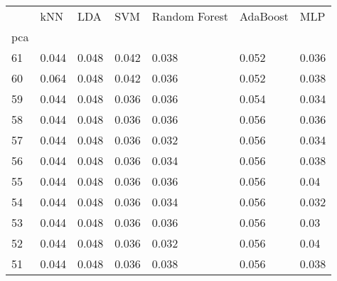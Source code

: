 \begin{tabular}{lllllll}
\toprule
{} &    kNN &    LDA &    SVM & Random Forest & AdaBoost &    MLP \\
pca &        &        &        &               &          &        \\
\midrule
61  &  0.044 &  0.048 &  0.042 &         0.038 &    0.052 &  0.036 \\
60  &  0.064 &  0.048 &  0.042 &         0.036 &    0.052 &  0.038 \\
59  &  0.044 &  0.048 &  0.036 &         0.036 &    0.054 &  0.034 \\
58  &  0.044 &  0.048 &  0.036 &         0.036 &    0.056 &  0.036 \\
57  &  0.044 &  0.048 &  0.036 &         0.032 &    0.056 &  0.034 \\
56  &  0.044 &  0.048 &  0.036 &         0.034 &    0.056 &  0.038 \\
55  &  0.044 &  0.048 &  0.036 &         0.036 &    0.056 &   0.04 \\
54  &  0.044 &  0.048 &  0.036 &         0.034 &    0.056 &  0.032 \\
53  &  0.044 &  0.048 &  0.036 &         0.036 &    0.056 &   0.03 \\
52  &  0.044 &  0.048 &  0.036 &         0.032 &    0.056 &   0.04 \\
51  &  0.044 &  0.048 &  0.036 &         0.038 &    0.056 &  0.038 \\
\bottomrule
\end{tabular}
